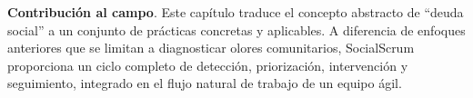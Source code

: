 \textbf{Contribución al campo}. Este capítulo traduce el concepto abstracto de ``deuda social'' a un conjunto de prácticas concretas y aplicables. A diferencia de enfoques anteriores que se limitan a diagnosticar olores comunitarios, SocialScrum proporciona un ciclo completo de detección, priorización, intervención y seguimiento, integrado en el flujo natural de trabajo de un equipo ágil.
